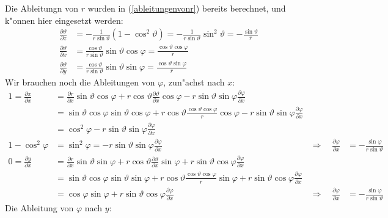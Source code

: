 Die Ableitungn von $r$ wurden in (\ref{ableitungenvonr}) bereits berechnet,
und k"onnen hier eingesetzt werden:
\begin{equation}
\begin{aligned}
\frac{\partial\vartheta}{\partial z}
&=
-\frac{1}{r\sin\vartheta}(1-\cos^2\vartheta)
=
-\frac{1}{r\sin\vartheta}\sin^2\vartheta
=
-\frac{\sin\vartheta}{r}
\\
\frac{\partial \vartheta}{\partial x}
&=
\frac{\cos\vartheta}{r\sin\vartheta}\sin\vartheta\cos\varphi
=
\frac{\cos\vartheta\cos\varphi}{r}
\\
\frac{\partial \vartheta}{\partial y}
&=
\frac{\cos\vartheta}{r\sin\vartheta}\sin\vartheta\sin\varphi
=
\frac{\cos\vartheta\sin\varphi}{r}
\end{aligned}
\label{ableitungenvonvartheta}
\end{equation}
Wir brauchen noch die Ableitungen von $\varphi$, zun"achst nach $x$:
\begin{align*}
1=
\frac{\partial x}{\partial x}
&=
\frac{\partial r}{\partial x}\sin\vartheta\cos\varphi
+
r\cos\vartheta \frac{\partial\vartheta}{\partial x}\cos\varphi
-
r\sin\vartheta\sin\varphi\frac{\partial\varphi}{\partial x}
\\
&=
\sin\vartheta \cos\varphi
\sin\vartheta\cos\varphi
+
r\cos\vartheta
\frac{\cos\vartheta \cos\varphi}{r}
\cos\varphi
-
r\sin\vartheta\sin\varphi
\frac{\partial\varphi}{\partial x}
\\
&=\cos^2\varphi-r\sin\vartheta\sin\varphi\frac{\partial\varphi}{\partial x}
\\
1-\cos^2\varphi
&=
\sin^2\varphi=
-r\sin\vartheta\sin\varphi\frac{\partial\varphi}{\partial x}
&\Rightarrow\quad
\frac{\partial\varphi}{\partial x}
&=-\frac{\sin\varphi}{r\sin\vartheta}
\\
0=
\frac{\partial y}{\partial x}
&=
\frac{\partial r}{\partial x} \sin\vartheta\sin\varphi
+
r\cos\vartheta \frac{\partial\vartheta}{\partial x}\sin\varphi
+
r\sin\vartheta\cos\varphi\frac{\partial\varphi}{\partial x}
\\
&=
\sin\vartheta\cos\varphi
\sin\vartheta\sin\varphi
+
r\cos\vartheta
\frac{\cos\vartheta\cos\varphi}{r}
\sin\varphi
+
r\sin\vartheta\cos\varphi\frac{\partial\varphi}{\partial x}
\\
&=
\cos\varphi\sin\varphi
+
r\sin\vartheta\cos\varphi
\frac{\partial\varphi}{\partial x}
&\Rightarrow\quad
\frac{\partial\varphi}{\partial x}
&=
-\frac{\sin\varphi}{r\sin\vartheta}
\end{align*}
Die Ableitung von $\varphi$ nach $y$:
